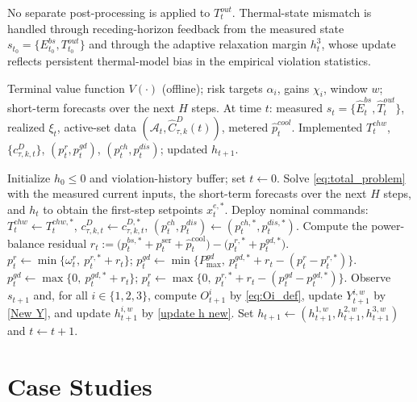 \documentclass[a4paper,fleqn]{cas-dc}
\theoremstyle{plain}
\theoremstyle{remark}
\theoremstyle{plain}
\begin{document}
No separate post-processing is applied to $T_t^{out}$. Thermal-state mismatch is handled through receding-horizon feedback from the measured state $s_{t_0}=\{E_{t_0}^{bs},T_{t_0}^{out}\}$ and through the adaptive relaxation margin $h_t^3$, whose update reflects persistent thermal-model bias in the empirical violation statistics.

\begin{algorithm}[t]
\caption{Learning-assist adaptive MPC with renewables-first correction.}
\label{alg:oa_smpc_pp_concise}
\begin{algorithmic}[1]
\REQUIRE Terminal value function $V(\cdot)$ (offline); risk targets $\alpha_i$, gains $\chi_i$, window $w$; short-term forecasts over the next $H$ steps.
\REQUIRE At time $t$: measured $s_t=\{\hat{E}_t^{bs},\hat{T}_t^{out}\}$, realized $\xi_t$, active-set data $(\mathcal{A}_t,\hat{C}_{\tau,k}^D(t))$, metered $\hat{p}_t^{cool}$.
\ENSURE Implemented $T_t^{chw}$, $\{c_{\tau,k,t}^D\}$, $(p_t^r,p_t^{gd})$, $(p_t^{ch},p_t^{dis})$; updated $h_{t+1}$.

\STATE Initialize $h_0\le 0$ and violation-history buffer; set $t\leftarrow 0$.
    \STATE Solve \eqref{eq:total_problem} with the measured current inputs, the short-term forecasts over the next $H$ steps, and $h_t$ to obtain the first-step setpoints $x_{t}^{e,*}$.
    \STATE Deploy nominal commands: $T_t^{chw}\!\leftarrow\!T_t^{chw,*}$, $c_{\tau,k,t}^D\!\leftarrow\!c_{\tau,k,t}^{D,*}$, $(p_t^{ch},p_t^{dis})\!\leftarrow\!(p_t^{ch,*},p_t^{dis,*})$.
    \STATE Compute the power-balance residual
    $r_t := \big(p_t^{bs,*}+p_t^{\text{ser}}+\hat{p}_t^{\text{cool}}\big)-\big(p_t^{r,*}+p_t^{gd,*}\big)$.
        \STATE $p_t^r \leftarrow \min\{\omega_t^r,\ p_t^{r,*}+r_t\}$; \quad
               $p_t^{gd} \leftarrow \min\{P_{\max}^{gd},\ p_t^{gd,*}+r_t-(p_t^r-p_t^{r,*})\}$.
    \ELSE
        \STATE $p_t^{gd} \leftarrow \max\{0,\ p_t^{gd,*}+r_t\}$; \quad
               $p_t^{r} \leftarrow \max\{0,\ p_t^{r,*}+r_t-(p_t^{gd}-p_t^{gd,*})\}$.
    \ENDIF
    \STATE Observe $s_{t+1}$ and, for all $i\in\{1,2,3\}$, compute $O_{t+1}^i$ by \eqref{eq:Oi_def}, update $Y_{t+1}^{i,w}$ by \eqref{New Y}, and update $h_{t+1}^{i,w}$ by \eqref{update h new}.
    \STATE Set $h_{t+1}\leftarrow (h_{t+1}^{1,w},h_{t+1}^{2,w},h_{t+1}^{3,w})$ and $t\leftarrow t+1$.
\ENDWHILE
\end{algorithmic}
\end{algorithm}



\section{Case Studies}\label{sec:case_studies}
\end{document}
